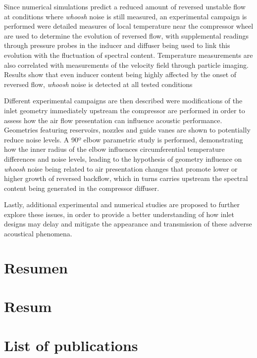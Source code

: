 \documentclass[final,twoside,11pt]{book}
\makeatletter
\numberwithin{equation}{section}
\numberwithin{figure}{chapter}
\numberwithin{table}{chapter}
\def\cleardoublepage{\clearpage\if@twoside \ifodd\c@page\else
  \hbox{}
  \thispagestyle{empty}
  \newpage
  \if@twocolumn\hbox{}\newpage\fi\fi\fi}
\makeatother
\begin{document}
Since numerical simulations predict a reduced amount of reversed unstable flow at conditions where \emph{whoosh} noise is still measured, an experimental campaign is performed were detailed measures of local temperature near the compressor wheel are used to determine the evolution of reversed flow, with supplemental readings through pressure probes in the inducer and diffuser being used to link this evolution with the fluctuation of spectral content. Temperature measurements are also correlated with measurements of the velocity field through particle imaging. Results show that even inducer content being highly affected by the onset of reversed flow, \emph{whoosh} noise is detected at all tested conditions

Different experimental campaigns are then described were modifications of the inlet geometry immediately upstream the compressor are performed in order to assess how the air flow presentation can influence acoustic performance. Geometries featuring reservoirs, nozzles and guide vanes are shown to potentially reduce noise levels. A 90º elbow parametric study is performed, demonstrating how the inner radius of the elbow influences circumferential temperature differences and noise levels, leading to the hypothesis of geometry influence on \emph{whoosh} noise being related to air presentation changes that promote lower or higher growth of reversed backflow, which in turns carries upstream the spectral content being generated in the compressor diffuser.

Lastly, additional experimental and numerical studies are proposed to further explore these issues, in order to provide a better understanding of how inlet designs may delay and mitigate the appearance and transmission of these adverse acoustical phenomena.

\cleardoublepage

\chapter*{Resumen}

\cleardoublepage

\chapter*{Resum}

\cleardoublepage
% 
\chapter*{List of publications}
\end{document}

